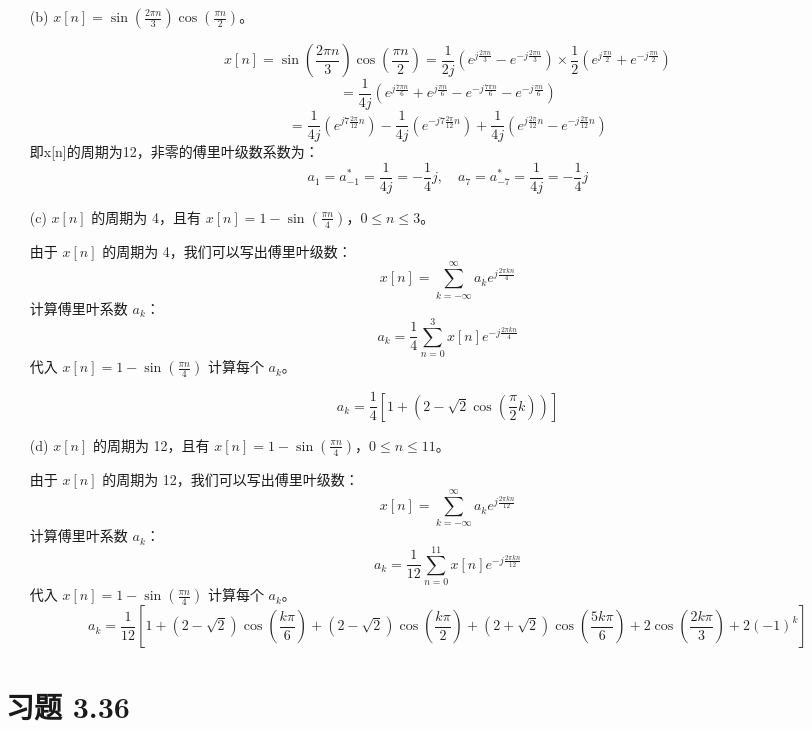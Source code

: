 \documentclass[UTF8]{report}
\theoremstyle{MyLineTheoremStyle} %
\theoremstyle{MyBlockTheoremStyle} %
\theoremstyle{MySubsubsectionStyle} %
\begin{document}
\begin{itemize}
    \item[(b)] $x[n] = \sin\left( \frac{2\pi n}{3} \right)\cos\left( \frac{\pi n}{2} \right)$。
    
    \[
    x[n] = \sin\left( \frac{2\pi n}{3} \right)\cos\left( \frac{\pi n}{2} \right) = \frac{1}{2j}\left( e^{j\frac{2\pi n}{3}} - e^{-j\frac{2\pi n}{3}} \right) \times \frac{1}{2}\left( e^{j\frac{\pi n}{2}} + e^{-j\frac{\pi n}{2}} \right)
    \]
    \[ 
        = \frac{1}{4j}\left( e^{j\frac{7\pi n}{6}} + e^{j\frac{\pi n}{6}} - e^{-j\frac{7\pi n}{6}} - e^{-j\frac{\pi n}{6}} \right)
    \]
    \[
    = \frac{1}{4j}\left( e^{j7\frac{2\pi}{12}n} \right) - \frac{1}{4j}\left( e^{-j7\frac{2\pi}{12}n} \right) + \frac{1}{4j}\left( e^{j\frac{2\pi}{12}n} - e^{-j\frac{2\pi}{12}n} \right)
    \]
    即x[n]的周期为12，非零的傅里叶级数系数为：
    \[
    a_1 = a_{-1}^* = \frac{1}{4j} = -\frac{1}{4}j, \quad a_7 = a_{-7}^* = \frac{1}{4j} = -\frac{1}{4}j
    \]

    \item[(c)] $x[n]$ 的周期为 4，且有 $x[n] = 1 - \sin\left( \frac{\pi n}{4} \right)$，$0 \leq n \leq 3$。
    
    由于 $x[n]$ 的周期为 4，我们可以写出傅里叶级数：
    \[
    x[n] = \sum_{k=-\infty}^{\infty} a_k e^{j \frac{2\pi k n}{4}}
    \]
    计算傅里叶系数 $a_k$：
    \[
    a_k = \frac{1}{4} \sum_{n=0}^{3} x[n] e^{-j \frac{2\pi k n}{4}}
    \]
    代入 $x[n] = 1 - \sin\left( \frac{\pi n}{4} \right)$ 计算每个 $a_k$。

    \[
    a_k = \frac{1}{4} \left[1 + (2-\sqrt{2}\cos (\frac{\pi}{2} k) )  \right]
    \]

    \item[(d)] $x[n]$ 的周期为 12，且有 $x[n] = 1 - \sin\left( \frac{\pi n}{4} \right)$，$0 \leq n \leq 11$。
    
    由于 $x[n]$ 的周期为 12，我们可以写出傅里叶级数：
    \[
    x[n] = \sum_{k=-\infty}^{\infty} a_k e^{j \frac{2\pi k n}{12}}
    \]
    计算傅里叶系数 $a_k$：
    \[
    a_k = \frac{1}{12} \sum_{n=0}^{11} x[n] e^{-j \frac{2\pi k n}{12}}
    \]
    代入 $x[n] = 1 - \sin\left( \frac{\pi n}{4} \right)$ 计算每个 $a_k$。
    \[
    a_k = \frac{1}{12} \left[1 + (2 - \sqrt{2})\cos(\frac{k\pi}{6}) + (2 - \sqrt{2})\cos(\frac{k\pi}{2}) + (2 + \sqrt{2})\cos(\frac{5k\pi}{6})+2\cos(\frac{2k\pi}{3})+2(-1)^k\right]
    \]
\end{itemize}


\section{习题 3.36}
\end{document}
